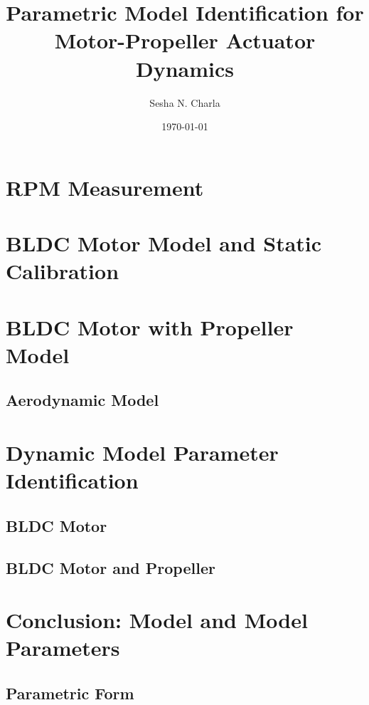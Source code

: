 \documentclass[letterpaper, 11pt]{article}
\title{Parametric Model Identification for Motor-Propeller Actuator Dynamics}
\author{Sesha N. Charla}
\date{\today}
\begin{document}
\maketitle
\tableofcontents

\newpage
\section{RPM Measurement}

\newpage
\section{BLDC Motor Model and Static Calibration}




\newpage
\section{BLDC Motor with Propeller Model}
\subsection{Aerodynamic Model}


\newpage
\section{Dynamic Model Parameter Identification}
\subsection{BLDC Motor}
\subsection{BLDC Motor and Propeller}
\newpage
\section{Conclusion: Model and Model Parameters}
\subsection{Parametric Form}
\newpage


\end{document}
